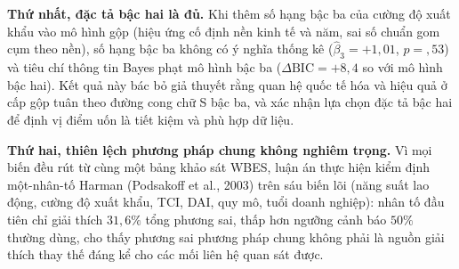 \documentclass[
  a4paper,
  13pt]{extreport}
\begin{document}
\textbf{Thứ nhất, đặc tả bậc hai là đủ.} Khi thêm số hạng bậc ba của
cường độ xuất khẩu vào mô hình gộp (hiệu ứng cố định nền kinh tế và năm,
sai số chuẩn gom cụm theo nền), số hạng bậc ba không có ý nghĩa thống kê
(\(\hat{\beta}_3 = +1{,}01\), \(p = {,}53\)) và tiêu chí thông tin Bayes
phạt mô hình bậc ba (\(\Delta\mathrm{BIC} = +8{,}4\) so với mô hình bậc
hai). Kết quả này bác bỏ giả thuyết rằng quan hệ quốc tế hóa và hiệu quả
ở cấp gộp tuân theo đường cong chữ S bậc ba, và xác nhận lựa chọn đặc tả
bậc hai để định vị điểm uốn là tiết kiệm và phù hợp dữ liệu.

\textbf{Thứ hai, thiên lệch phương pháp chung không nghiêm trọng.} Vì
mọi biến đều rút từ cùng một bảng khảo sát WBES, luận án thực hiện kiểm
định một-nhân-tố Harman (Podsakoff et al., 2003) trên sáu biến lõi (năng
suất lao động, cường độ xuất khẩu, TCI, DAI, quy mô, tuổi doanh nghiệp):
nhân tố đầu tiên chỉ giải thích \(31{,}6\%\) tổng phương sai, thấp hơn
ngưỡng cảnh báo \(50\%\) thường dùng, cho thấy phương sai phương pháp
chung không phải là nguồn giải thích thay thế đáng kể cho các mối liên
hệ quan sát được.
\end{document}
